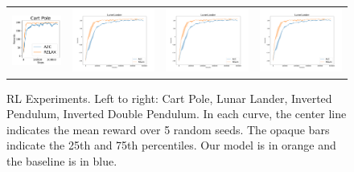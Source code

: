 \documentclass{article}
\begin{document}
\begin{figure}[!htb]
\centering
\hspace*{-.3in}
\begin{tabular}{cccc}
\setlength{\tabcolsep}{10pt}
\renewcommand{\arraystretch}{0}
\includegraphics[width=.25\linewidth]{figures/cp_paper} & 
\includegraphics[width=.25\linewidth]{figures/ll_paper} &
\includegraphics[width=.25\linewidth]{figures/ll_paper} & 
\includegraphics[width=.25\linewidth]{figures/ll_paper}\\
 \end{tabular}
\caption{RL Experiments. Left to right: Cart Pole, Lunar Lander, Inverted Pendulum, Inverted Double Pendulum. In each curve, the center line indicates the mean reward over 5 random seeds. The opaque bars indicate the 25th and 75th percentiles. Our model is in orange and the baseline is in blue.}
\label{fig:rl_results}
\end{figure}
\end{document}

